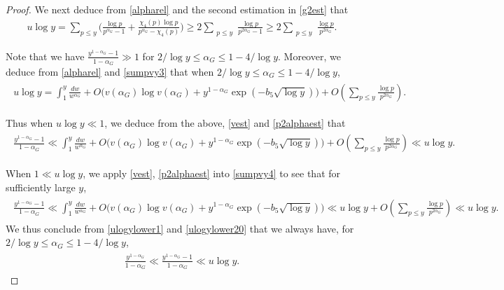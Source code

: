 \documentclass[twoside,leqno,10pt, A4]{amsart}
\begin{document}
\begin{proof}
   We next deduce from \eqref{alpharel} and the second estimation in \eqref{g2est} that 
\begin{align}
\label{p2alphaest}
u\log y=\sum_{p \leq y}\Big(\frac {\log p}{p^{\alpha_G}-1}+\frac {\chi_4(p)\log p}{p^{\alpha_G}-\chi_4(p)}\Big ) \geq 2\sum_{\substack{p \leq y }} \frac {\log p}{p^{2\alpha_G}-1} \geq  2\sum_{\substack{p \leq y }} \frac {\log p}{p^{2\alpha_G}} .
\end{align}  
  
   Note that we have $\frac {y^{1-\alpha_G}-1}{1-\alpha_G} \gg 1$ for $2/\log y \leq \alpha_G \leq 1-4/\log y$. Moreover, we deduce from \eqref{alpharel} and \eqref{sumpvy3} that when $2/\log y \leq \alpha_G \leq 1-4/\log y$, 
\begin{align}
\label{sumpvy4}
\begin{split}
  u\log y =\int^{y}_1\frac {dw}{w^{\alpha_G}}+ O\Big(v(\alpha_G)\log v(\alpha_G)+y^{1-\alpha_G}\exp(-b_5\sqrt{\log y})\Big)+O(\sum_{p \leq y}\frac {\log p}{p^{2\alpha_G}}).
\end{split}
\end{align}  
   
   
   Thus when $u \log y \ll 1$, we deduce from the above, \eqref{vest} and  \eqref{p2alphaest} that 
\begin{align}
\label{ulogylower1}
\begin{split}
 \frac {y^{1-\alpha_G}-1}{1-\alpha_G} \ll  \int^{y}_1\frac {dw}{w^{\alpha_G}}+ O\Big(v(\alpha_G)\log v(\alpha_G)+y^{1-\alpha_G}\exp(-b_5\sqrt{\log y})\Big)+O(\sum_{p \leq y}\frac {\log p}{p^{2\alpha_G}}) \ll u\log y.
\end{split}
\end{align}  

  When $1 \ll u\log y$, we apply \eqref{vest}, \eqref{p2alphaest} into \eqref{sumpvy4} to see that for sufficiently large $y$, 
\begin{align}
\label{ulogylower20}
\begin{split}
 \frac {y^{1-\alpha_G}-1}{1-\alpha_G} \ll  \int^{y}_1\frac {dw}{w^{\alpha_G}}+O\Big(v(\alpha_G)\log v(\alpha_G)+y^{1-\alpha_G}\exp(-b_5\sqrt{\log y})\Big) \ll u\log y+O(\sum_{p \leq y}\frac {\log p}{p^{2\alpha_G}}) \ll u\log y.
\end{split}
\end{align}  
  We thus conclude from \eqref{ulogylower1} and \eqref{ulogylower20} that we always have, for $2/\log y \leq \alpha_G \leq 1-4/\log y$, 
\begin{align}
\label{ypowerupper}
\begin{split}
 \frac {y^{1-\alpha_G}}{1-\alpha_G} \ll \frac {y^{1-\alpha_G}-1}{1-\alpha_G} \ll  u\log y.
\end{split}
\end{align}    
  

\end{proof}
\end{document}
